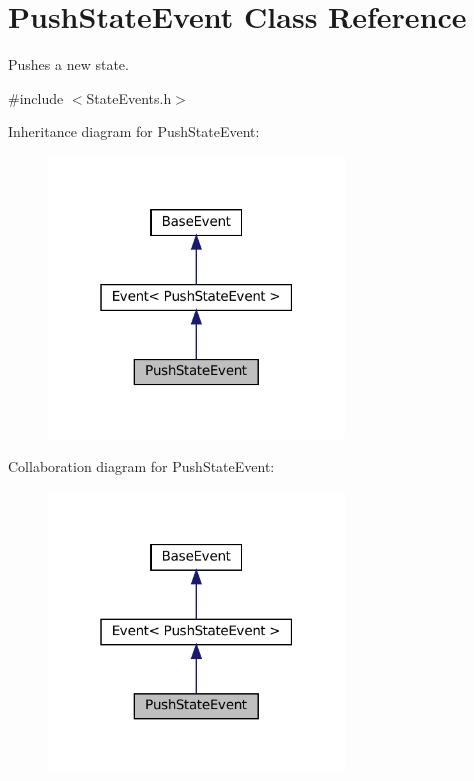 \hypertarget{classPushStateEvent}{}\section{Push\+State\+Event Class Reference}
\label{classPushStateEvent}


Pushes a new state.  




{\ttfamily \#include $<$State\+Events.\+h$>$}



Inheritance diagram for Push\+State\+Event\+:
\nopagebreak
\begin{figure}[H]
\begin{center}
\leavevmode
\includegraphics[width=223pt]{classPushStateEvent__inherit__graph}
\end{center}
\end{figure}


Collaboration diagram for Push\+State\+Event\+:
\nopagebreak
\begin{figure}[H]
\begin{center}
\leavevmode
\includegraphics[width=223pt]{classPushStateEvent__coll__graph}
\end{center}
\end{figure}
